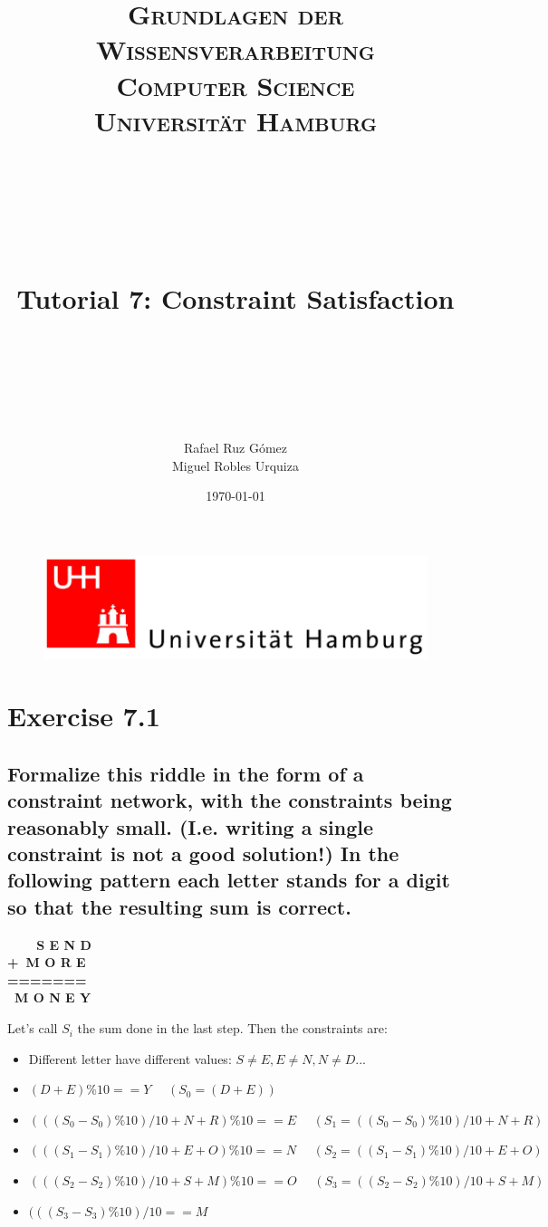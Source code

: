 \documentclass[paper=a4, fontsize=11pt]{scrartcl} %
\title{	
\normalfont \normalsize 
\textsc{\textbf{Grundlagen der Wissensverarbeitung} \\ Computer Science \\ Universität Hamburg} \\ [25pt] %
~\\
~\\
~\\
\horrule{0.5pt} \\[0.4cm] %
\Huge Tutorial 7: Constraint Satisfaction\\ %
\horrule{2pt} \\[0.5cm] %
~\\
~\\
}
\author{Rafael Ruz Gómez\\Miguel Robles Urquiza} %
\date{\normalsize \today} %
\numberwithin{equation}{section} %
\numberwithin{figure}{section} %
\numberwithin{table}{section} %
\begin{document}
\maketitle %

\begin{figure}
	\centering
	\includegraphics[scale=0.8]{logo_uni_hamburg.png}
\end{figure}

\newpage %





\section*{Exercise 7.1}

\subsection*{Formalize this riddle in the form of a constraint network, with the constraints being reasonably small. (I.e. writing a single constraint is not a good solution!) In the following pattern each letter stands for a digit so that the resulting sum is correct.}
\textbf{
\ \ \ \ S E N D\\
+\  M O R E\\
=======\\
\ M O N E Y\\
}

Let's call $S_i$ the sum done in the last step. Then the constraints are:
\begin{itemize}
	\item Different letter have different values: $S \neq E , E \neq N , N \neq D...$
	\item $(D + E) \% 10 == Y \ \ \ \ \ \ ( S_0 = (D + E) )$
	\item $ (((S_0 - S_0) \% 10) / 10 + N + R) \% 10 == E \ \ \ \ \ \ ( S_1 = ((S_0 - S_0) \% 10) / 10 + N + R ) $
	\item $ (((S_1 - S_1) \% 10) / 10 + E + O) \% 10 == N \ \ \ \ \ \ ( S_2 = ((S_1 - S_1) \% 10) / 10 + E + O) $
	\item $ (((S_2 - S_2) \% 10) / 10 + S + M) \% 10 == O \ \ \ \ \ \ ( S_3 = ((S_2 - S_2) \% 10) / 10 + S + M) $
	\item $ (((S_3 - S_3) \% 10) / 10 == M $
\end{itemize}
\end{document}
